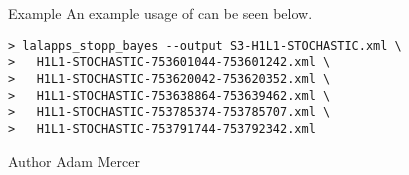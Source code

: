 \begin{entry}
\item[Example]
An example usage of  can be seen below.

\begin{verbatim}
> lalapps_stopp_bayes --output S3-H1L1-STOCHASTIC.xml \
>   H1L1-STOCHASTIC-753601044-753601242.xml \
>   H1L1-STOCHASTIC-753620042-753620352.xml \
>   H1L1-STOCHASTIC-753638864-753639462.xml \
>   H1L1-STOCHASTIC-753785374-753785707.xml \
>   H1L1-STOCHASTIC-753791744-753792342.xml
\end{verbatim}

\item[Author]
Adam Mercer
\end{entry}
